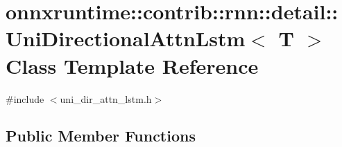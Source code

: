 \hypertarget{classonnxruntime_1_1contrib_1_1rnn_1_1detail_1_1UniDirectionalAttnLstm}{}\section{onnxruntime\+:\+:contrib\+:\+:rnn\+:\+:detail\+:\+:Uni\+Directional\+Attn\+Lstm$<$ T $>$ Class Template Reference}
\label{classonnxruntime_1_1contrib_1_1rnn_1_1detail_1_1UniDirectionalAttnLstm}


{\ttfamily \#include $<$uni\+\_\+dir\+\_\+attn\+\_\+lstm.\+h$>$}

\subsection*{Public Member Functions}
